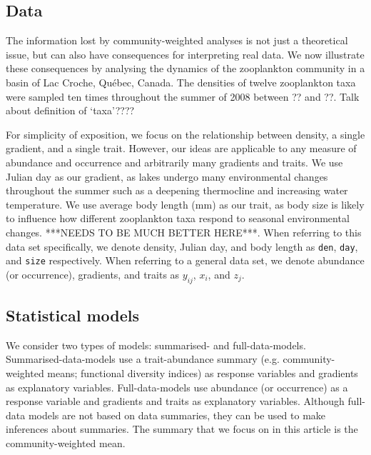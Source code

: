 \documentclass[12pt]{ecology}
\begin{document}
\subsection{Data}

The information lost by community-weighted analyses is not just a theoretical issue, but can also have consequences for interpreting real data.  We now illustrate these consequences by analysing the dynamics of the zooplankton community in a basin of Lac Croche, Qu\'{e}bec, Canada.  The densities of twelve zooplankton taxa were sampled ten times throughout the summer of 2008 between ?? and ??.    Talk about definition of `taxa'????

For simplicity of exposition, we focus on the relationship between density, a single gradient, and a single trait.  However, our ideas are applicable to any measure of abundance and occurrence and arbitrarily many gradients and traits.  We use Julian day as our gradient, as lakes undergo many environmental changes throughout the summer such as a deepening thermocline and increasing water temperature.  We use average body length (mm) as our trait, as body size is likely to influence how different zooplankton taxa respond to seasonal environmental changes.  ***NEEDS TO BE MUCH BETTER HERE***.  When referring to this data set specifically, we denote density, Julian day, and body length as \texttt{den}, \texttt{day}, and \texttt{size} respectively.  When referring to a general data set, we denote abundance (or occurrence), gradients, and traits as $y_{ij}$, $x_i$, and $z_j$.


\subsection{Statistical models}

We consider two types of models: summarised- and full-data-models.  Summarised-data-models use a trait-abundance summary (e.g. community-weighted means; functional diversity indices) as response variables and gradients as explanatory variables.  Full-data-models use abundance (or occurrence) as a response variable and gradients and traits as explanatory variables.  Although full-data models are not based on data summaries, they can be used to make inferences about summaries.  The summary that we focus on in this article is the community-weighted mean.
\end{document}
